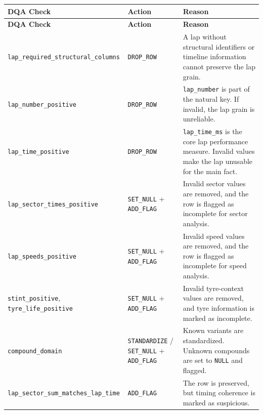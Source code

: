 \documentclass[a4paper,11pt]{article}
\begin{document}
	\begin{longtable}{p{6cm}p{2.5cm}p{6.4cm}}
		\toprule
		\textbf{DQA Check} & \textbf{Action} & \textbf{Reason} \\
		\midrule
		\endfirsthead
		
		\toprule
		\textbf{DQA Check} & \textbf{Action} & \textbf{Reason} \\
		\midrule
		\endhead
		
		\texttt{lap\_required\_structural\_columns}
		& \texttt{DROP\_ROW}
		& A lap without structural identifiers or timeline information cannot preserve the lap grain. \\
		\midrule
		
		\texttt{lap\_number\_positive}
		& \texttt{DROP\_ROW}
		& \texttt{lap\_number} is part of the natural key. If invalid, the lap grain is unreliable. \\
		\midrule
		
		\texttt{lap\_time\_positive}
		& \texttt{DROP\_ROW}
		& \texttt{lap\_time\_ms} is the core lap performance measure. Invalid values make the lap unusable for the main fact. \\
		\midrule
		
		\texttt{lap\_sector\_times\_positive}
		& \texttt{SET\_NULL} + \texttt{ADD\_FLAG}
		& Invalid sector values are removed, and the row is flagged as incomplete for sector analysis. \\
		\midrule
		
		\texttt{lap\_speeds\_positive}
		& \texttt{SET\_NULL} + \texttt{ADD\_FLAG}
		& Invalid speed values are removed, and the row is flagged as incomplete for speed analysis. \\
		\midrule
		
		\texttt{stint\_positive}, \texttt{tyre\_life\_positive}
		& \texttt{SET\_NULL} + \texttt{ADD\_FLAG}
		& Invalid tyre-context values are removed, and tyre information is marked as incomplete. \\
		\midrule
		
		\texttt{compound\_domain}
		& \texttt{STANDARDIZE} / \texttt{SET\_NULL} + \texttt{ADD\_FLAG}
		& Known variants are standardized. Unknown compounds are set to \texttt{NULL} and flagged. \\
		\midrule
		
		\texttt{lap\_sector\_sum\_matches\_lap\_time}
		& \texttt{ADD\_FLAG}
		& The row is preserved, but timing coherence is marked as suspicious. \\
		\bottomrule
	\end{longtable}
	
\end{document}
